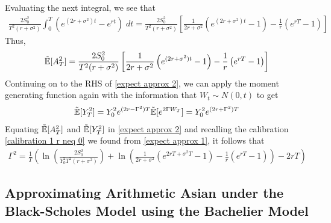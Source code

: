 \documentclass[reqno]{amsart}
\newcommand{\rE}[1]{\tilde{\E}[#1]}
\begin{document}
Evaluating the next integral, we see that
\begin{align}
     \frac{2 S_0^2}{T^2(r + \sigma^2)} \int_0^T  (e^{(2r+\sigma^2)t} - e^{rt}) \; dt = \frac{2 S_0^2}{T^2(r + \sigma^2)} \left[ \frac{1}{2r+\sigma^2} \left( e^{(2r + \sigma^2)t} - 1 \right) - \frac{1}{r} \left( e^{rT} - 1 \right) \right]
\end{align}
Thus,
\begin{align}
     \rE{A_T^2} =  
     \frac{2 S_0^2}{T^2(r + \sigma^2)} \left[ \frac{1}{2r+\sigma^2} \left( e^{(2r + \sigma^2)t} - 1 \right) - \frac{1}{r} \left( e^{rT} - 1 \right) \right]
\end{align}
Continuing on to the RHS of \eqref{expect approx 2}, we can apply the moment generating function again with the information that $W_t \sim N(0, t)$ to get
\begin{align}
     \rE{Y_T^2}
     = Y_0^2 e^{(2r-\Gamma^2)T} \rE{e^{2\Gamma W_T}}
     = Y_0^2 e^{(2r+\Gamma^2)T}
\end{align}
Equating $\rE{A_T^2}$ and $\rE{Y_T^2}$ in \eqref{expect approx 2} and recalling the calibration \eqref{calibration 1 r neq 0} we found from \eqref{expect approx 1}, it follows that
\begin{align}
     \Gamma^2 = \frac{1}{T} \left( \ln{\left( \frac{2S_0^2}{Y_0^2 T^2 (r+\sigma^2)} \right)}+\ln{\left( \frac{1}{2r+\sigma^2} \left( e^{2rT+\sigma^2T} - 1 \right) -\frac{1}{r}(e^{rT}-1) \right)} -2rT \right)
\end{align}

\subsection{Approximating Arithmetic Asian under the Black-Scholes Model using the Bachelier Model}
\end{document}
